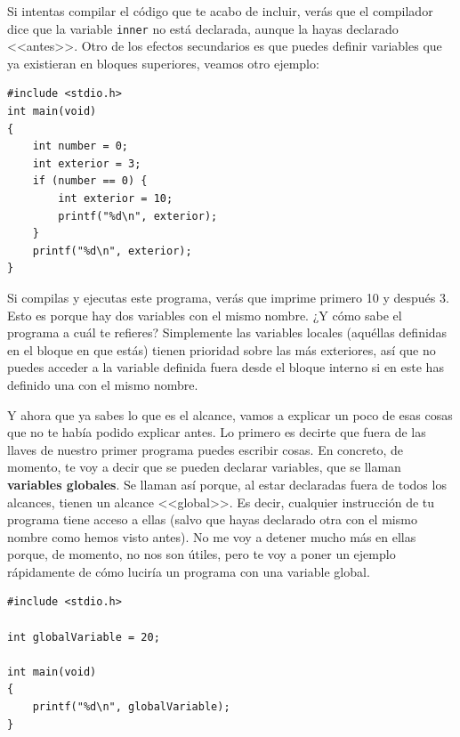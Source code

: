 \documentclass[a4paper]{article}
\begin{document}
Si intentas compilar el código que te acabo de incluir, verás que el compilador
dice que la variable \texttt{inner} no está declarada, aunque la hayas
declarado <<antes>>. Otro de los efectos secundarios es que puedes definir
variables que ya existieran en bloques superiores, veamos otro ejemplo:


\noindent
\begin{minipage}[H]{\linewidth}
\mbox{}
\begin{lstlisting}[style=C,
caption={Ejemplo de redifinición de variable},
label={lst:varRedefinition}]
#include <stdio.h>
int main(void)
{
    int number = 0;
    int exterior = 3;
    if (number == 0) {
        int exterior = 10;
        printf("%d\n", exterior);
    }
    printf("%d\n", exterior);
}
\end{lstlisting}
\end{minipage}


Si compilas y ejecutas este programa, verás que imprime primero 10 y después
3. Esto es porque hay dos variables con el mismo nombre. ¿Y cómo sabe el
programa a cuál te refieres? Simplemente las variables locales (aquéllas
definidas en el bloque en que estás) tienen prioridad sobre las más exteriores,
así que no puedes acceder a la variable definida fuera desde el bloque
interno si en este has definido una con el mismo nombre.

Y ahora que ya sabes lo que es el alcance, vamos a explicar un poco de esas
cosas que no te había podido explicar antes. Lo primero es decirte que fuera
de las llaves de nuestro primer programa puedes escribir cosas. En concreto,
de momento, te voy a decir que se pueden declarar variables, que se llaman
\textbf{variables globales}. Se llaman así porque, al estar declaradas fuera
de todos los alcances, tienen un alcance <<global>>. Es decir, cualquier
instrucción de tu programa tiene acceso a ellas (salvo que hayas declarado
otra con el mismo nombre como hemos visto antes). No me voy a detener mucho
más en ellas porque, de momento, no nos son útiles, pero te voy a poner un
ejemplo rápidamente de cómo luciría un programa con una variable global.


\noindent
\begin{minipage}[H]{\linewidth}
\mbox{}
\begin{lstlisting}[style=C,
caption={Ejemplo de programa con una variable global},
label={lst:globalVar}]
#include <stdio.h>

int globalVariable = 20;

int main(void)
{
    printf("%d\n", globalVariable);
}
\end{lstlisting}
\end{minipage}
\end{document}
